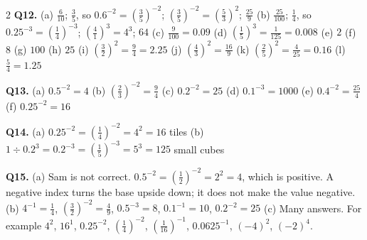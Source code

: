 \documentclass[12pt,a4paper]{article}
\newcommand{\ealkey}[1]{\textcolor{ealkeycolour}{#1}}
\begin{document}
{\begin{multicols}{2}
\textbf{Q12.} (a) $\frac{6}{10}$; \; $\frac35$, so
$0.6^{-2}=\left(\frac35\right)^{-2}$; \;
$\left(\frac35\right)^{-2}=\left(\frac53\right)^2$; \; $\frac{25}{9}$ \quad
(b) $\frac{25}{100}$; \; $\frac14$, so $0.25^{-3}=\left(\frac14\right)^{-3}$;
\; $\left(\frac41\right)^3=4^3$; \; $64$ \quad
(c) $\frac{9}{100}=0.09$ \quad (d) $\left(\frac15\right)^3=\frac1{125}=0.008$
\quad (e) $2$ \quad (f) $8$ \quad (g) $100$ \quad (h) $25$ \quad
(i) $\left(\frac32\right)^2=\frac94=2.25$ \quad
(j) $\left(\frac43\right)^2=\frac{16}{9}$ \quad
(k) $\left(\frac25\right)^2=\frac4{25}=0.16$ \quad (l) $\frac54=1.25$

\textbf{Q13.} (a) $0.5^{-2}=4$ \quad (b) $\left(\frac23\right)^{-2}=\frac94$
\quad (c) $0.2^{-2}=25$ \quad (d) $0.1^{-3}=1000$ \quad
(e) $0.4^{-2}=\frac{25}{4}$ \quad (f) $0.25^{-2}=16$

\textbf{Q14.} (a) $0.25^{-2}=\left(\frac14\right)^{-2}=4^2=16$ tiles \quad
(b) $1\div0.2^3=0.2^{-3}=\left(\frac15\right)^{-3}=5^3=125$ small \ealkey{cubes}

\textbf{Q15.} (a) Sam is not correct.
$0.5^{-2}=\left(\frac12\right)^{-2}=2^2=4$, which is \ealkey{positive}. A \ealkey{negative} \ealkey{index}
turns the \ealkey{base} upside down; it does not make the value \ealkey{negative}. \quad
(b) $4^{-1}=\frac14$, \; $\left(\frac32\right)^{-2}=\frac49$, \;
$0.5^{-3}=8$, \; $0.1^{-1}=10$, \; $0.2^{-2}=25$ \quad (c) Many answers. For
example $4^2$, $16^1$, $0.25^{-2}$, $\left(\frac14\right)^{-2}$,
$\left(\frac1{16}\right)^{-1}$, $0.0625^{-1}$, $(-4)^2$, $(-2)^4$.

\end{multicols}
}
\end{document}
